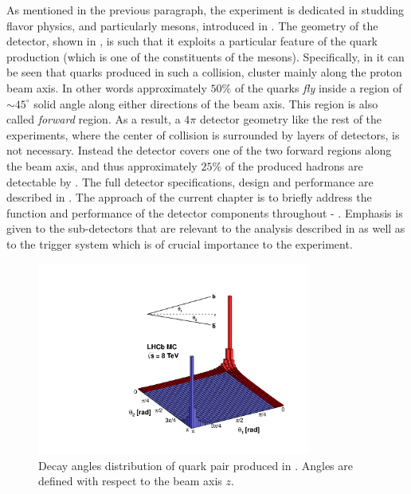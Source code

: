 As mentioned in the previous paragraph, the \lhcb experiment is dedicated in studding flavor physics, 
and particularly \B mesons, introduced in . The geometry of the \lhcb detector, 
shown in , is such that it exploits a particular feature of the 
\bquark quark production (which is one of the constituents of the \B mesons). Specifically, in  
it can be seen that \bquark quarks produced in such a collision, cluster mainly along the proton beam axis. 
In other words approximately $50\%$ of the \bquark quarks {\it fly} inside a region of $\sim 45^\circ$ solid 
angle along either directions of the beam axis. This region is also called {\it forward} region. 
As a result, a $4\pi$ detector geometry like the rest of the \lhc experiments, where the center of collision 
is surrounded by layers of detectors, is not necessary. Instead the \lhcb detector covers one of the two 
forward regions along the beam axis, and thus approximately $25\%$ of the produced \bquark hadrons are 
detectable by \lhcb. The full \lhcb detector specifications, design and performance are described in \cite{Aaij:2014jba}.
The approach of the current chapter is to briefly address the function and performance of the detector components
throughout  - . Emphasis is given to the sub-detectors that are relevant
to the analysis described in  as well as to the trigger system which is of crucial importance
to the \lhcb experiment.

\begin{figure}[t]
  \centering
  \includegraphics[width=0.8\textwidth, trim=0cm 0cm 0cm 2.5cm, clip=true]{Figures/Chapter2/08_rad_acc_scheme_right}
  \caption{Decay angles distribution of \bquark quark pair produced in \lhcb. Angles are defined with
           respect to the beam axis $z$.}
  \label{bb_roduction_angles}
\end{figure}

